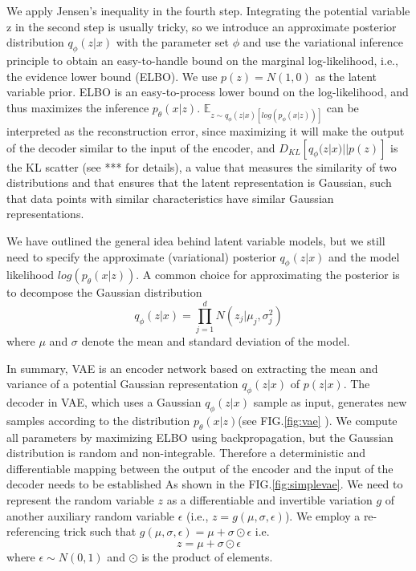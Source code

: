 \documentclass[%
reprint,
amsmath,amssymb,
aps,
]{revtex4-2}
\begin{document}
	We apply Jensen's inequality in the fourth step. Integrating the potential variable z in the second step is usually tricky, so we introduce an approximate posterior distribution $q_{\phi}(z|x)$ with the parameter set $\phi$ and use the variational inference principle to obtain an easy-to-handle bound on the marginal log-likelihood, i.e., the evidence lower bound (ELBO). We use $p(z)=N(1,0)$ as the latent variable prior. ELBO is an easy-to-process lower bound on the log-likelihood, and thus maximizes the inference $p_{\theta}(x|z)$. $\mathbb E_{z \sim q_{\phi}(z|x)[log(p_{\phi}(x|z))]}$ can be interpreted as the reconstruction error, since maximizing it will make the output of the decoder similar to the input of the encoder, and $D_{KL}[q_{\phi}(z|x)||p(z)]$ is the KL scatter (see *** for details), a value that measures the similarity of two distributions and that ensures that the latent representation is Gaussian, such that data points with similar characteristics have similar Gaussian representations.

	We have outlined the general idea behind latent variable models, but we still need to specify the approximate (variational) posterior $q_{\phi}(z|x)$ and the model likelihood $log(p_{\theta}(x|z))$. A common choice for approximating the posterior is to decompose the Gaussian distribution
	\begin{equation}\label{prop}
		q_{\phi}(z|x) = \prod^d_{j=1} N(z_j|\mu_j,\sigma_j^2)
	\end{equation}
	where $\mu$ and $\sigma$ denote the mean and standard deviation of the model.
	
	In summary, VAE is an encoder network based on extracting the mean and variance of a potential Gaussian representation $q_{\phi}(z|x)$ of $p(z|x)$. The decoder in VAE, which uses a Gaussian $q_{\phi}(z|x)$ sample as input, generates new samples according to the distribution $p_{\theta}(x|z)$(see FIG.\ref{fig:vae} ). We compute all parameters by maximizing ELBO using backpropagation, but the Gaussian distribution is random and non-integrable. Therefore a deterministic and differentiable mapping between the output of the encoder and the input of the decoder needs to be established As shown in the FIG.\ref{fig:simplevae}. We need to represent the random variable $z$ as a differentiable and invertible variation $g$ of another auxiliary random variable $\epsilon$ (i.e., $z = g(\mu,\sigma,\epsilon)$). We employ a re-referencing trick such that $g(\mu,\sigma,\epsilon) = \mu + \sigma \odot \epsilon$ i.e.
	\begin{equation}\label{reparam}
		z  = \mu + \sigma \odot \epsilon
	\end{equation}
	where $\epsilon \sim N(0,1)$ and $\odot$ is the product of elements.
	
\end{document}
